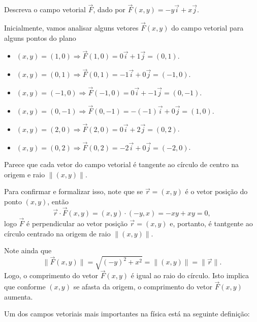 \begin{example}
    Descreva o campo vetorial \(\overrightarrow{F}\), dado por \(\overrightarrow{F}(x,y) = -y\overrightarrow{i} + x\overrightarrow{j}\).

    Inicialmente, vamos analisar alguns vetores \(\overrightarrow{F}(x,y)\) do campo vetorial para alguns pontos do plano
        \begin{itemize}
            \item \((x,y) = (1,0) \Rightarrow \overrightarrow{F}(1,0) = 0\overrightarrow{i} + 1\overrightarrow{j} = (0,1)\).
            \item \((x,y) = (0,1) \Rightarrow \overrightarrow{F}(0,1) = -1\overrightarrow{i} + 0\overrightarrow{j} = (-1,0)\).
            \item \((x,y) = (-1,0) \Rightarrow \overrightarrow{F}(-1,0) = 0\overrightarrow{i} + -1\overrightarrow{j} = (0,-1)\).
            \item \((x,y) = (0,-1) \Rightarrow \overrightarrow{F}(0,-1) = -(-1)\overrightarrow{i} + 0\overrightarrow{j} = (1,0)\).
            \item \((x,y) = (2,0) \Rightarrow \overrightarrow{F}(2,0) = 0\overrightarrow{i} + 2\overrightarrow{j} = (0,2)\).
            \item \((x,y) = (0,2) \Rightarrow \overrightarrow{F}(0,2) = -2\overrightarrow{i} + 0\overrightarrow{j} = (-2,0)\).
        \end{itemize}

    Parece que cada vetor do campo vetorial é tangente ao círculo de centro na origem e raio \(\|(x,y)\|\).

    Para confirmar e formalizar isso, note que se \(\overrightarrow{r} = (x,y)\) é o vetor posição do ponto \((x,y)\), então \[\overrightarrow{r}\cdot\overrightarrow{F}(x,y) = (x,y)\cdot(-y,x) = -xy + xy = 0,\] logo \(\overrightarrow{F}\) é perpendicular ao vetor posição \(\overrightarrow{r}=(x,y)\) e, portanto, é tantgente ao círculo centrado na origem de raio \(\|(x,y)\|\).

    Note ainda que \[\|\overrightarrow{F}(x,y)\| = \sqrt{(-y)^2 + x^2} = \|(x,y)\| = \|\overrightarrow{r}\|.\] Logo, o comprimento do vetor \(\overrightarrow{F}(x,y)\) é igual ao raio do círculo. Isto implica que conforme \((x,y)\) se afasta da origem, o comprimento do vetor \(\overrightarrow{F}(x,y)\) aumenta.
\end{example}

Um dos campos vetoriais mais importantes na física está na seguinte definição:

